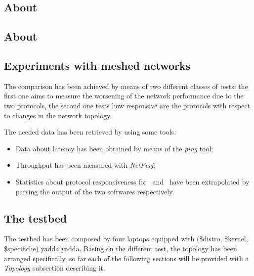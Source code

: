 \begin{multicols}{2}

    \subsection{About \batman}

    \subsection{About \olsr}

    \subsection{Experiments with meshed networks}

        The comparison has been achieved by means of two different classes
        of tests: the first one aims to measure the worsening of the network
        performance due to the two protocols, the second one tests how
        responsive are the protocols with respect to changes in the
        network topology.
        
        The needed data has been retrieved by using some tools:
        \begin{itemize}
        \item   Data about latency has been obtained by means of the
                \emph{ping} tool;
        \item   Throughput has been measured with
                \emph{NetPerf}\cite{bib:NetPerf};
        \item   Statistics about protocol responsiveness for \batman\ and
                \olsr\ have been extrapolated by parsing the output of the
                two softwares respectively.
        \end{itemize}

    \subsection{The testbed}

        The testbed has been composed by four laptops equipped with
        (\$distro, \$kernel, \$specifiche) yadda yadda. Basing on the
        different test, the topology has been arranged specifically, so
        far each of the following sections will be provided with a
        \emph{Topology} subsection describing it.

\end{multicols}
